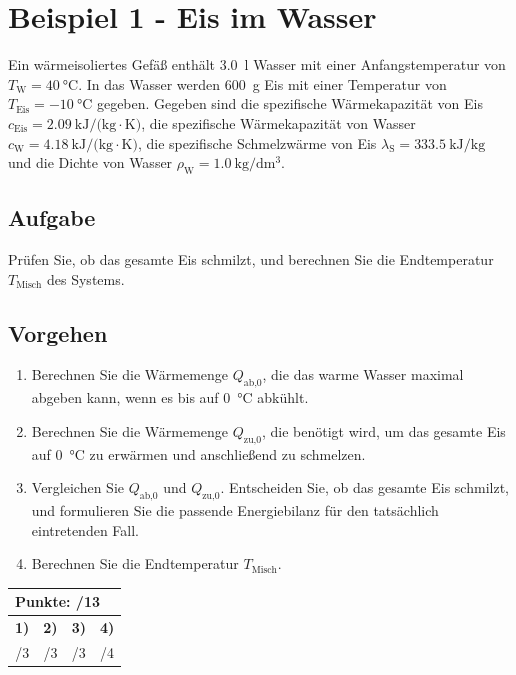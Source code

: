 \documentclass[11pt, a4paper]{article}
\begin{document}
\newpage

\section*{Beispiel 1 - Eis im Wasser}

Ein wärmeisoliertes Gefäß enthält \SI{3.0}{\litre} Wasser mit einer Anfangstemperatur von $T_{\text{W}} = \SI{40}{\degreeCelsius}$. In das Wasser werden \SI{600}{\gram} Eis mit einer Temperatur von $T_{\text{Eis}} = \SI{-10}{\degreeCelsius}$ gegeben. 
Gegeben sind die spezifische Wärmekapazität von Eis $c_{\text{Eis}} = \SI{2.09}{\kilo\joule\per(\kilogram\cdot\kelvin)}$, die spezifische Wärmekapazität von Wasser $c_{\text{W}} = \SI{4.18}{\kilo\joule\per(\kilogram\cdot\kelvin)}$, die spezifische Schmelzwärme von Eis $\lambda_{\text{S}} = \SI{333.5}{\kilo\joule\per\kilogram}$ und die Dichte von Wasser $\rho_{\text{W}} = \SI{1.0}{\kilogram\per\deci\metre\cubed}$.

\subsection*{Aufgabe}
Prüfen Sie, ob das gesamte Eis schmilzt, und berechnen Sie die Endtemperatur $T_{\text{Misch}}$ des Systems.

\subsection*{Vorgehen}
\begin{enumerate}
    \item Berechnen Sie die Wärmemenge $Q_{\text{ab,0}}$, die das warme Wasser maximal abgeben kann, wenn es bis auf \SI{0}{\degreeCelsius} abkühlt.
    \item Berechnen Sie die Wärmemenge $Q_{\text{zu,0}}$, die benötigt wird, um das gesamte Eis auf \SI{0}{\degreeCelsius} zu erwärmen und anschließend zu schmelzen.
    \item Vergleichen Sie $Q_{\text{ab,0}}$ und $Q_{\text{zu,0}}$. Entscheiden Sie, ob das gesamte Eis schmilzt, und formulieren Sie die passende Energiebilanz für den tatsächlich eintretenden Fall.
    \item Berechnen Sie die Endtemperatur $T_{\text{Misch}}$.
\end{enumerate}

\vfill
\begin{flushright}
\renewcommand{\arraystretch}{1.23}
\begin{tabular}{| c | c | c | c|}
\hline
\multicolumn{4}{|l|}{\textbf{\large{Punkte: \quad\quad\quad /13}}}\\
\hline
\textbf{1)} & \textbf{2)} & \textbf{3)} & \textbf{4)} \\
\quad/3 & \quad/3 & \quad/3 & \quad/4 \\
\hline
\end{tabular}
\end{flushright}
\end{document}
